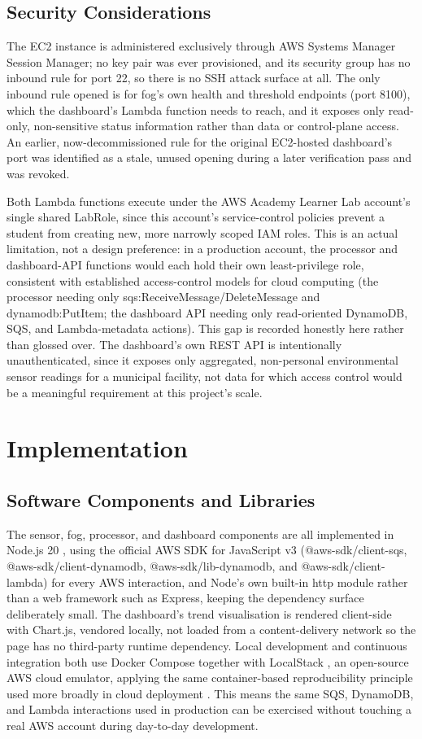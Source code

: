 \documentclass[conference]{IEEEtran}
\begin{document}
\subsection{Security Considerations}
The EC2 instance is administered exclusively through AWS Systems Manager Session Manager; no key pair was ever provisioned, and its security group has no inbound rule for port 22, so there is no SSH attack surface at all. The only inbound rule opened is for fog's own health and threshold endpoints (port 8100), which the dashboard's Lambda function needs to reach, and it exposes only read-only, non-sensitive status information rather than data or control-plane access. An earlier, now-decommissioned rule for the original EC2-hosted dashboard's port was identified as a stale, unused opening during a later verification pass and was revoked.

Both Lambda functions execute under the AWS Academy Learner Lab account's single shared LabRole, since this account's service-control policies prevent a student from creating new, more narrowly scoped IAM roles. This is an actual limitation, not a design preference: in a production account, the processor and dashboard-API functions would each hold their own least-privilege role, consistent with established access-control models for cloud computing \cite{ref17} (the processor needing only sqs:ReceiveMessage/DeleteMessage and dynamodb:PutItem; the dashboard API needing only read-oriented DynamoDB, SQS, and Lambda-metadata actions). This gap is recorded honestly here rather than glossed over. The dashboard's own REST API is intentionally unauthenticated, since it exposes only aggregated, non-personal environmental sensor readings for a municipal facility, not data for which access control would be a meaningful requirement at this project's scale.

\section{Implementation}

\subsection{Software Components and Libraries}
The sensor, fog, processor, and dashboard components are all implemented in Node.js 20 \cite{ref18}, using the official AWS SDK for JavaScript v3 (@aws-sdk/client-sqs, @aws-sdk/client-dynamodb, @aws-sdk/lib-dynamodb, and @aws-sdk/client-lambda) for every AWS interaction, and Node's own built-in http module rather than a web framework such as Express, keeping the dependency surface deliberately small. The dashboard's trend visualisation is rendered client-side with Chart.js, vendored locally, not loaded from a content-delivery network so the page has no third-party runtime dependency. Local development and continuous integration both use Docker Compose \cite{ref19} together with LocalStack \cite{ref20}, an open-source AWS cloud emulator, applying the same container-based reproducibility principle used more broadly in cloud deployment \cite{ref21}. This means the same SQS, DynamoDB, and Lambda interactions used in production can be exercised without touching a real AWS account during day-to-day development.
\end{document}
